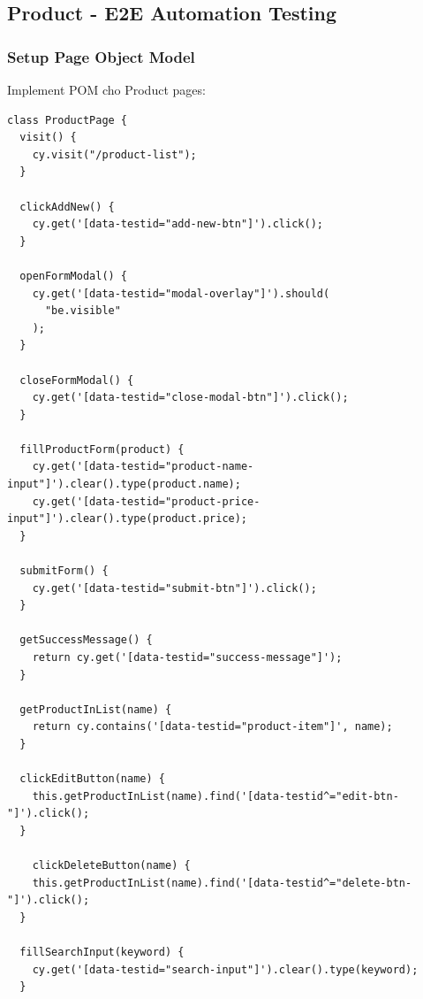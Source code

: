 \documentclass[a4paper,12pt]{article}
\begin{document}
{\begin{itemize}

\end{itemize}



\subsection{Product - E2E Automation Testing}

\subsubsection{Setup Page Object Model}

Implement POM cho Product pages:
\begin{tcolorbox}[breakable, colback=green!5,colframe=black!50,title=Implement POM Cho Product Pages ]
\begin{lstlisting}
class ProductPage {
  visit() {
    cy.visit("/product-list");
  }

  clickAddNew() {
    cy.get('[data-testid="add-new-btn"]').click();
  }

  openFormModal() {
    cy.get('[data-testid="modal-overlay"]').should(
      "be.visible"
    );
  }

  closeFormModal() {
    cy.get('[data-testid="close-modal-btn"]').click();
  }

  fillProductForm(product) {
    cy.get('[data-testid="product-name-input"]').clear().type(product.name);
    cy.get('[data-testid="product-price-input"]').clear().type(product.price);
  }

  submitForm() {
    cy.get('[data-testid="submit-btn"]').click();
  }

  getSuccessMessage() {
    return cy.get('[data-testid="success-message"]');
  }

  getProductInList(name) {
    return cy.contains('[data-testid="product-item"]', name);
  }

  clickEditButton(name) {
    this.getProductInList(name).find('[data-testid^="edit-btn-"]').click();
  }

    clickDeleteButton(name) {
    this.getProductInList(name).find('[data-testid^="delete-btn-"]').click();
  }

  fillSearchInput(keyword) {
    cy.get('[data-testid="search-input"]').clear().type(keyword);
  }


\end{lstlisting}
\end{tcolorbox}}
\end{document}

